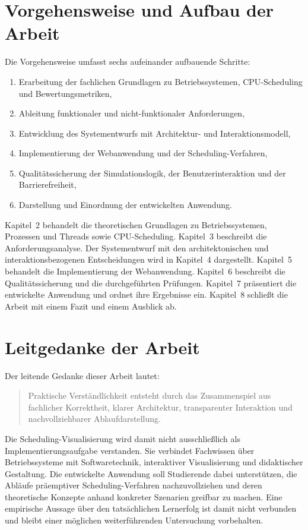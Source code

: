 \section{Vorgehensweise und Aufbau der Arbeit}

Die Vorgehensweise umfasst sechs aufeinander aufbauende Schritte:

\begin{enumerate}
    \item Erarbeitung der fachlichen Grundlagen zu Betriebssystemen, CPU-Scheduling und Bewertungsmetriken,
    \item Ableitung funktionaler und nicht-funktionaler Anforderungen,
    \item Entwicklung des Systementwurfs mit Architektur- und Interaktionsmodell,
    \item Implementierung der Webanwendung und der Scheduling-Verfahren,
    \item Qualitätssicherung der Simulationslogik, der Benutzerinteraktion und der Barrierefreiheit,
    \item Darstellung und Einordnung der entwickelten Anwendung.
\end{enumerate}

Kapitel~2 behandelt die theoretischen Grundlagen zu Betriebssystemen, Prozessen und Threads sowie CPU-Scheduling. Kapitel~3 beschreibt die Anforderungsanalyse. Der Systementwurf mit den architektonischen und interaktionsbezogenen Entscheidungen wird in Kapitel~4 dargestellt. Kapitel~5 behandelt die Implementierung der Webanwendung. Kapitel~6 beschreibt die Qualitätssicherung und die durchgeführten Prüfungen. Kapitel~7 präsentiert die entwickelte Anwendung und ordnet ihre Ergebnisse ein. Kapitel~8 schließt die Arbeit mit einem Fazit und einem Ausblick ab.

\section{Leitgedanke der Arbeit}

Der leitende Gedanke dieser Arbeit lautet:

\begin{quote}
Praktische Verständlichkeit entsteht durch das Zusammenspiel aus fachlicher Korrektheit, klarer Architektur, transparenter Interaktion und nachvollziehbarer Ablaufdarstellung.
\end{quote}

Die Scheduling-Visualisierung wird damit nicht ausschließlich als Implementierungsaufgabe verstanden. Sie verbindet Fachwissen über Betriebssysteme mit Softwaretechnik, interaktiver Visualisierung und didaktischer Gestaltung. Die entwickelte Anwendung soll Studierende dabei unterstützen, die Abläufe präemptiver Scheduling-Verfahren nachzuvollziehen und deren theoretische Konzepte anhand konkreter Szenarien greifbar zu machen. Eine empirische Aussage über den tatsächlichen Lernerfolg ist damit nicht verbunden und bleibt einer möglichen weiterführenden Untersuchung vorbehalten.